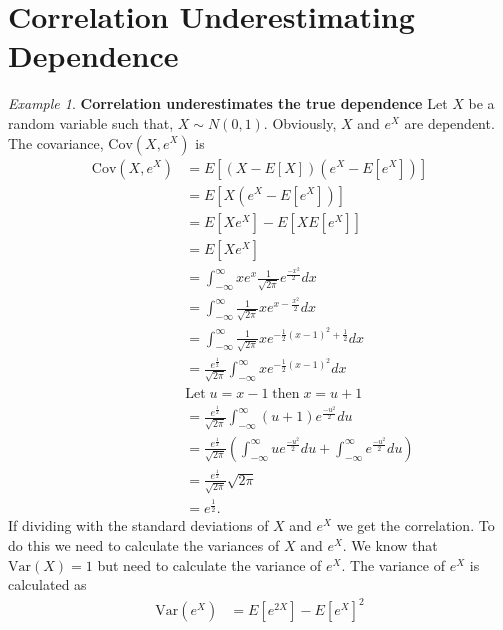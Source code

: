 \documentclass[%
a4paper,							
11pt,								
bibliography=totoc,						
abstracton=true					
]
{scrartcl}
\theoremstyle{plain}
\theoremstyle{definition}
\theoremstyle{remark}
\newtheorem{example}[theorem]{Example}
\newcommand{\1}{\mathbbm{1}}
\begin{document}
\section{Correlation Underestimating Dependence }\label{sec:CorrelationUnderestimates}
\begin{example} 
    \textbf{Correlation underestimates the true dependence} 
    Let $X$ be a random variable such that, $X \sim N(0,1)$. Obviously, $X$ and $e^X$ are dependent. The covariance, $\mathrm{Cov}(X,e^X)$ is
    \begin{align*}
        \mathrm{Cov}(X,e^X) &= E \left[  (X-E\left[  X \right])(e^X-E\left[  e^X \right])  \right]\\
         &=  E \left[  X(e^X-E\left[  e^X \right]) \right]\\
         &= E \left[  Xe^X  \right] - E \left[  X E \left[  e^X \right] \right]\\
         &= E \left[  Xe^X  \right]\\
         &= \int_{-\infty}^\infty xe^x \frac{1}{\sqrt{2\pi}} e^{\frac{-x^2}{2}} dx\\ %
         &=  \int_{-\infty}^\infty \frac{1}{\sqrt{2\pi}} x  e^{x -\frac{x^2}{2}} dx \\
         &= \int_{-\infty}^\infty \frac{1}{\sqrt{2\pi}} x  e^{-\frac{1}{2}(x-1)^2+\frac{1}{2} } dx \\
         &= \frac{e^\frac{1}{2}}{\sqrt{2\pi}}\int_{-\infty}^\infty x  e^{-\frac{1}{2}(x-1)^2 } dx\\
         & \mathrm{Let\;} u = x-1 \; \mathrm{then\;} x = u+1\\
         &= \frac{e^\frac{1}{2}}{\sqrt{2\pi}}\int_{-\infty}^\infty (u+1)e^{\frac{-u^2}{2}} du\\
         &= \frac{e^\frac{1}{2}}{\sqrt{2\pi}} \left( \int_{-\infty}^\infty ue^{\frac{-u^2}{2}}du +\int_{-\infty}^\infty e^{\frac{-u^2}{2}} du  \right) \\
         &= \frac{e^\frac{1}{2}}{\sqrt{2\pi}}\sqrt{2\pi}   \\
         &= e^{\frac{1}{2}}.
    \end{align*}
    If dividing with the standard deviations of $X$ and $e^X$ we get the correlation. To do this we need to calculate the variances of $X$ and $e^X$. We know that $\mathrm{Var}(X) = 1$ but need to calculate the variance of $e^X$. The variance of $e^X$ is calculated as
    \begin{align*}
        \mathrm{Var}(e^X) &= E[e^{2X}] - E[e^X]^2\\

\end{align*}
\end{example}
\end{document}
